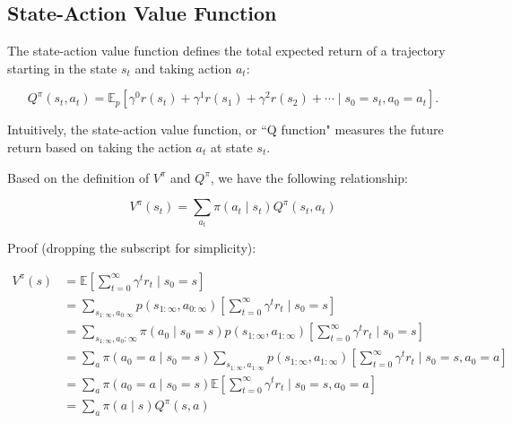 \documentclass[11pt]{article}
\begin{document}
\subsection{State-Action Value Function}
The state-action value function defines the total expected return of a trajectory starting in the state $s_t$ and taking action $a_t$:

$$Q^{\pi}(s_t, a_t)=\mathbb{E}_{p}\left[\gamma^{0} r\left(s_{t}\right)+\gamma^{1} r\left(s_{1}\right)+\gamma^{2} r\left(s_{2}\right)+\cdots \mid s_{0}=s_t, a_{0}=a_t\right].$$

Intuitively, the state-action value function, or ``Q function" measures the future return based on taking the action $a_t$ at state $s_t$. 

Based on the definition of $V^\pi$ and $Q^\pi$, we have the following relationship: 

$$V^{\pi}(s_t)=\sum_{a_t} \pi(a_t \mid s_t) Q^{\pi}(s_t, a_t)$$

Proof (dropping the subscript for simplicity): 

\begin{align*}
V^{\pi}(s) &=\mathbb{E}\left[\sum_{t=0}^{\infty} \gamma^{t} r_{t} \mid s_{0}=s\right] \\
&=\sum_{s_{1: \infty}, a_{0: \infty}} p\left(s_{1: \infty}, a_{0: \infty}\right)\left[\sum_{t=0}^{\infty} \gamma^{t} r_{t} \mid s_{0}=s\right] \\
&=\sum_{s_{1: \infty}, a_{0}: \infty} \pi\left(a_{0} \mid s_{0}=s\right) p\left(s_{1: \infty}, a_{1: \infty}\right)\left[\sum_{t=0}^{\infty} \gamma^{t} r_{t} \mid s_{0}=s\right] \\
&=\sum_{a} \pi\left(a_{0}=a \mid s_{0}=s\right) \sum_{s_{1: \infty}, a_{1: \infty}} p\left(s_{1: \infty}, a_{1: \infty}\right)\left[\sum_{t=0}^{\infty} \gamma^{t} r_{t} \mid s_{0}=s, a_{0}=a\right] \\
&=\sum_{a} \pi\left(a_{0}=a \mid s_{0}=s\right) \mathbb{E}\left[\sum_{t=0}^{\infty} \gamma^{t} r_{t} \mid s_{0}=s, a_{0}=a\right] \\
&=\sum_{a} \pi(a \mid s) Q^{\pi}(s, a)
\end{align*}


\end{document}
